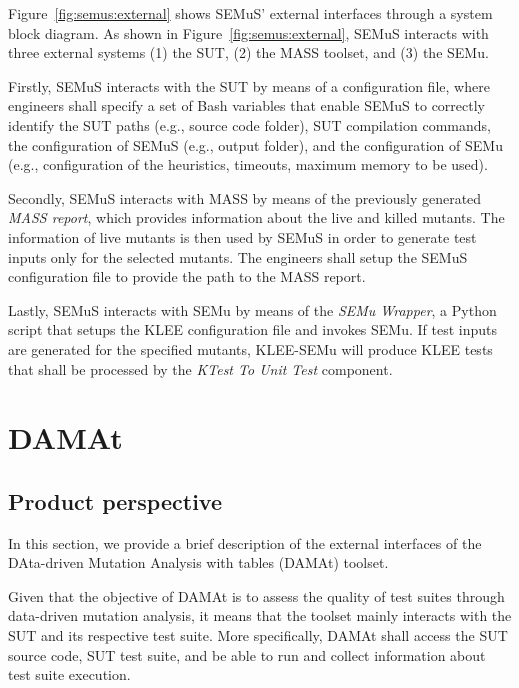 Figure~\ref{fig:semus:external} shows SEMuS' external interfaces through a system block diagram.
As shown in Figure~\ref{fig:semus:external}, SEMuS interacts with three external systems (1) the SUT, (2) the MASS toolset, and (3) the SEMu.

Firstly, SEMuS interacts with the SUT by means of a configuration file, where engineers shall specify a set of Bash variables that enable SEMuS to correctly identify the SUT paths (e.g., source code folder), SUT compilation commands, the configuration of SEMuS (e.g., output folder), and the configuration of SEMu (e.g., configuration of the heuristics, timeouts, maximum memory to be used).

Secondly, SEMuS interacts with MASS by means of the previously generated \emph{MASS report}, which provides information about the live and killed mutants. The information of live mutants is then used by SEMuS in order to generate test inputs only for the selected mutants.
The engineers shall setup the SEMuS configuration file to provide the path to the MASS report.

Lastly, SEMuS interacts with SEMu by means of the \emph{SEMu Wrapper}, a Python script that setups the KLEE configuration file and invokes SEMu. If test inputs are generated for the specified mutants, KLEE-SEMu will produce KLEE tests that shall be processed by the \emph{KTest To Unit Test} component.

\section{DAMAt}

\subsection{Product perspective}


In this section, we provide a brief description of the external interfaces of the DAta-driven Mutation Analysis with tables (DAMAt) toolset.

Given that the objective of DAMAt is to assess the quality of test suites through data-driven mutation analysis, it means that the toolset mainly interacts with the SUT and its respective test suite. More specifically, DAMAt shall access the SUT source code, SUT test suite, and be able to run and collect information about test suite execution.

